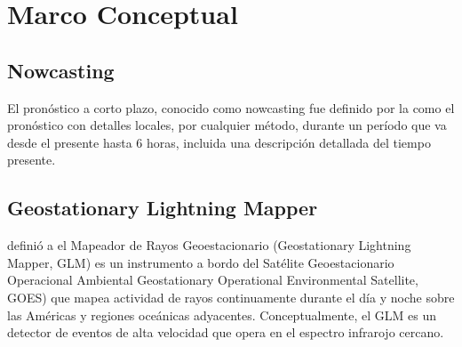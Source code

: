 \section{Marco Conceptual}

\subsection{Nowcasting}
El pronóstico a corto plazo, conocido como nowcasting fue definido por la
\cite{wmo2017} como el pronóstico con detalles locales, por cualquier método, 
durante un período que va desde el presente hasta 6 horas, incluida una 
descripción detallada del tiempo presente.


\subsection{Geostationary Lightning Mapper}
\cite{GOODMAN201334} definió a el Mapeador de Rayos Geoestacionario (Geostationary Lightning Mapper, GLM) es un
instrumento a bordo del Satélite Geoestacionario Operacional Ambiental 
Geostationary Operational Environmental Satellite, GOES) que mapea actividad de 
rayos continuamente durante el día y noche sobre las Américas y regiones 
oceánicas adyacentes. Conceptualmente, el GLM es un detector de eventos de alta 
velocidad que opera en el espectro infrarojo cercano.

